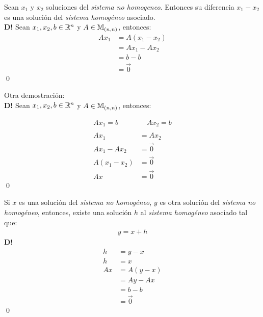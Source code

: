 \begin{teorema}
{
    \label{thm:6}
    Sean $x_1$ y $x_2$ soluciones del \textit{sistema no homogeneo}. Entonces su diferencia $x_1 - x_2$ es una solución del \textit{sistema homogéneo} asociado. \\

    \textbf{D!} Sean $x_1, x_2, b \in \mathbb{R}^n$ y $A \in \mathbb{M}_{(n, n)}$, entonces:
    \begin{align*}
        Ax_1 &= A(x_1 - x_2) \\
            &= Ax_1 - Ax_2 \\
            &= b - b \\
            &= \vec{0}
    \end{align*}\qed

    Otra demostración: \\

    \textbf{D!} Sean $x_1, x_2, b \in \mathbb{R}^n$ y $A \in \mathbb{M}_{(n, n)}$, entonces:

    \begin{align*}
        Ax_1 = b \quad & \quad Ax_2 = b \\ \\
        Ax_1 &= Ax_2 \\
        Ax_1 - Ax_2 &= \vec{0} \\
        A(x_1 - x_2) &= \vec{0} \\
        Ax &= \vec{0}
    \end{align*}\qed
}
\end{teorema}

\begin{corolario}
{
    Si $x$ es una solución del \textit{sistema no homogéneo}, $y$ es otra solución del \textit{sistema no homogéneo}, entonces, existe una solución $h$ al \textit{sistema homogéneo} asociado tal que:
    \begin{align*}
        y = x + h
    \end{align*}
    \textbf{D!} \begin{align*}
        h &= y - x \\
        h &= x \\
        Ax &= A(y - x) \\
        &= Ay - Ax \\
        &= b - b \\
        &= \vec{0}
    \end{align*}\qed \\

    \begin{note}
    \end{note}
}
\end{corolario}

